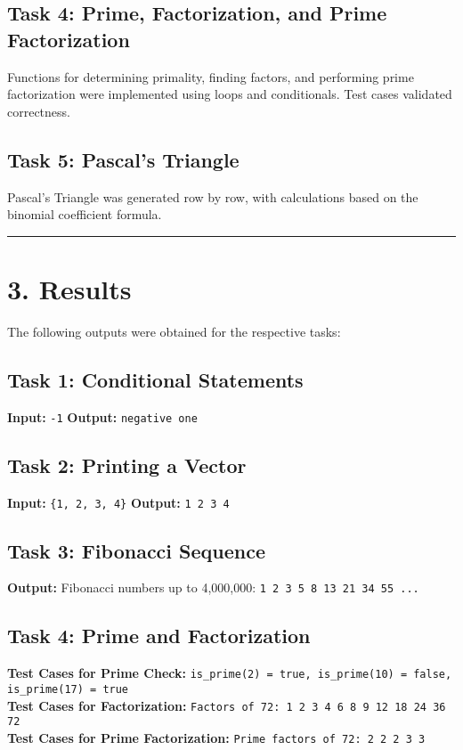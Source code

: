 \documentclass[12pt]{article}
\begin{document}
\subsection*{Task 4: Prime, Factorization, and Prime Factorization}
Functions for determining primality, finding factors, and performing prime factorization were implemented using loops and conditionals. Test cases validated correctness.

\subsection*{Task 5: Pascal's Triangle}
Pascal's Triangle was generated row by row, with calculations based on the binomial coefficient formula.
\vspace{6pt}
\hrule
\section*{3. Results}

The following outputs were obtained for the respective tasks:

\subsection*{Task 1: Conditional Statements}
\textbf{Input:} \texttt{-1} \newline
\textbf{Output:} \texttt{negative one}

\subsection*{Task 2: Printing a Vector}
\textbf{Input:} \texttt{\{1, 2, 3, 4\}} \newline
\textbf{Output:} \texttt{1 2 3 4}

\subsection*{Task 3: Fibonacci Sequence}
\textbf{Output:} Fibonacci numbers up to 4,000,000: \newline
\texttt{1 2 3 5 8 13 21 34 55 ...}

\subsection*{Task 4: Prime and Factorization}
\textbf{Test Cases for Prime Check:} \newline
\texttt{is\_prime(2) = true, is\_prime(10) = false, is\_prime(17) = true} \\[8pt]
\textbf{Test Cases for Factorization:} \newline
\texttt{Factors of 72: 1 2 3 4 6 8 9 12 18 24 36 72} \\[8pt]
\textbf{Test Cases for Prime Factorization:} \newline
\texttt{Prime factors of 72: 2 2 2 3 3}
\end{document}
